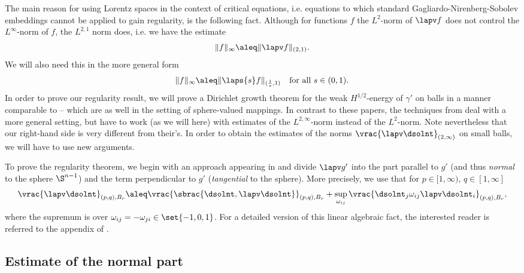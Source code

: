 The main reason for using Lorentz spaces in the context of critical equations, i.e. equations to which
standard Gagliardo-Nirenberg-Sobolev embeddings cannot be applied to gain regularity, is the following fact.
Although for functions $f$ the $L^2$-norm of $\lapv  f$ does not control the 
$L^\infty$-norm of $f$, the $L^{2,1}$ norm does, i.e. we have the estimate
\begin{equation*}
  \|f\|_{\infty} \aleq \|\lapv   f\|_{(2,1)}.
\end{equation*}
We will also need this in the more general form
\begin{equation*}
 \|f\|_{\infty} \aleq \|\laps{s} f\|_{(\frac 1 s,1)} \quad \mbox{for all $s\in(0,1)$.}
\end{equation*}
% 
% 
In order to prove our regularity result, we will prove a Dirichlet growth theorem for the 
weak $H^{1/2}$-energy of $\gamma'$ on balls in a manner comparable to \cite{DR11Sphere,SchikorranharmSphere}
 -- which are as well in the setting of sphere-valued mappings.
In contrast to these papers, the techniques from \cite{DR11Man,DL11MannD,SchikorraIntBoundFrac11}
deal with a more general setting, but have to work (as we will here) with estimates
of the $L^{2,\infty}$-norm instead of the $L^2$-norm.
Note nevertheless that our right-hand side is very different from their's. In order to obtain the estimates
of the norms $\vrac{\lapv \dsolnt}_{(2,\infty)}$ on small balls, we will have to use new
arguments.

To prove the regularity theorem, we begin with an approach appearing in \cite{DR11Sphere, SchikorranharmSphere} and
divide $\lapv g'$ into the part parallel to $g'$ (and thus \emph{normal} to the sphere $\S^{n-1}$) and
the term perpendicular to $g'$ (\emph{tangential} to the sphere). More precisely, we use that for $p \in [1,\infty)$, $q \in [1,\infty]$
\begin{equation}\label{eq:differencegtanggorth}
 \vrac{\lapv \dsolnt}_{(p,q),B_r} \aleq \vrac{\sbrac{\dsolnt,\lapv \dsolnt}}_{(p,q),B_r} 
  + \sup_{\omega_{ij}} \vrac{\dsolnt_j \omega_{ij}\lapv \dsolnt_i}_{(p,q),B_r},
\end{equation}
where the supremum is over $\omega_{ij} = -\omega_{ji} \in\set{-1,0,1}$.
For a detailed version of this linear algebraic fact, the interested reader is referred to the appendix of \cite{DLSnalphaSphere}.

\subsection{Estimate of the normal part}


